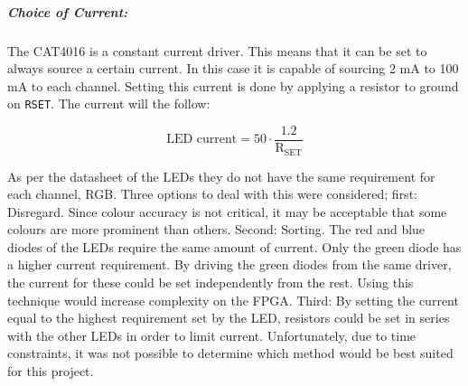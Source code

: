 
\subparagraph{Choice of Current:}
The CAT4016 is a constant current driver.
This means that it can be set to always source a certain current.
In this case it is capable of sourcing 2 mA to 100 mA to each channel.
Setting this current is done by applying a resistor to ground on \texttt{RSET}.
The current will the follow:

$$\text{LED current} = 50 \cdot \frac{1.2}{\text{R}_\text{SET}}$$

As per the datasheet of the LEDs they do not have the same requirement for each channel, RGB.
Three options to deal with this were considered; 
first: Disregard. Since colour accuracy is not critical, it may be acceptable that some colours are more prominent than others.
Second: Sorting. The red and blue diodes of the LEDs require the same amount of current.
Only the green diode has a higher current requirement.
By driving the green diodes from the same driver, the current for these could be set independently from the rest.
Using this technique would increase complexity on the FPGA.
Third: By setting the current equal to the highest requirement set by the LED, resistors could be set in series with the other LEDs in order to limit current.
Unfortunately, due to time constraints, it was not possible to determine which method would be best suited for this project.


